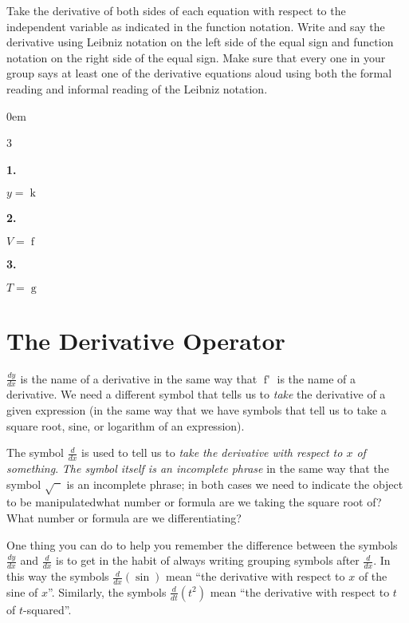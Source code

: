 \documentclass[12pt,]{book}
\theoremstyle{plain}
\theoremstyle{definition}
\numberwithin{equation}{section}
\newenvironment{exercisegroup}%
{\medskip\noindent}%
{\par\bigskip}%
\newlength{\exercisegroupindent}%
\newlength{\exercisegroupitemwidth}%
\newenvironment{exercisegrouplist}%
{\vspace{-\partopsep}%
\begin{adjustwidth}{\exercisegroupindent}{0em}}%
{\end{adjustwidth}%
\vspace{-\partopsep}%
\vspace{\baselineskip}}%
\newenvironment{exercisegroupbycol}[1]%
{\begin{exercisegrouplist}%
\vspace{-\multicolsep}%
\begin{multicols}{#1}%
\setlength{\parindent}{0em}%
\setlength{\exercisegroupitemwidth}{\linewidth}}%
{\end{multicols}%
\vspace{-\multicolsep}%
\end{exercisegrouplist}}%
\newenvironment{exercisegroupitem}[1]%
{\begin{minipage}[t]{\exercisegroupitemwidth}
\vspace{0pt}%
{\bfseries#1}%
\rule{0pt}{\baselineskip}}{\strut%
\end{minipage}%
\hspace{\columnsep}}%
\providecommand\phantomsection{}
\newcommand{\fe}[2]{\mathop{{#1}{\left(#2\right)}}}
\newcommand{\fd}[1]{#1'}
\newcommand{\lz}[2]{\frac{d#1}{d#2}}
\newcommand{\lzo}[1]{\frac{d}{d#1}}
\newcommand{\lzoo}[2]{{\frac{d}{d#1}}{\left(#2\right)}}
\begin{document}
\begin{exercisegroup}%
Take the derivative of both sides of each equation with respect to the independent variable as indicated in the function notation.  Write and say the derivative using Leibniz notation on the left side of the equal sign and function notation on the right side of the equal sign.  Make sure that every one in your group says at least one of the derivative equations aloud using both the formal reading and informal reading of the Leibniz notation.%
\par
\begin{exercisegroupbycol}{3}%
\begin{exercisegroupitem}{1. }\phantomsection\hypertarget{exercise-279}{\null}
\(y=\fe{k}{t}\)%
\end{exercisegroupitem}%
\par%
\begin{exercisegroupitem}{2. }\phantomsection\hypertarget{exercise-280}{\null}
\(V=\fe{f}{r}\)%
\end{exercisegroupitem}%
\par%
\begin{exercisegroupitem}{3. }\phantomsection\hypertarget{exercise-281}{\null}
\(T=\fe{g}{P}\)%
\end{exercisegroupitem}%
\par%
\end{exercisegroupbycol}%
\end{exercisegroup}%
\typeout{************************************************}
\typeout{************************************************}
\section[The Derivative Operator]{The Derivative Operator}\label{section-derivative-operator}
\(\lz{y}{x}\) is the name of a derivative in the same way that \(\fe{\fd{f}}{x}\) is the name of a derivative.  We need a different symbol that tells us to \emph{take} the derivative of a given expression (in the same way that we have symbols that tell us to take a square root, sine, or  logarithm of an expression).%
\par
The symbol \(\lzo{x}\) is used to tell us to \emph{take the derivative with respect to \(x\) of something}. \emph{The symbol itself is an incomplete phrase} in the same way that the symbol \(\sqrt{\phantom{x}}\) is an incomplete phrase; in both cases we need to indicate the object to be manipulated\textemdash{}what number or formula are we taking the square root of? What number or formula  are we differentiating?%
\par
One thing you can do to help you remember the difference between the symbols \(\lz{y}{x}\) and \(\lzo{x}\) is to get in the habit of always writing grouping symbols after \(\lzo{x}\).  In this way the symbols \(\lzoo{x}{\fe{\sin}{x}}\) mean ``the derivative with respect to \(x\) of the sine of \(x\)''.  Similarly, the symbols \(\lzoo{t}{t^2}\) mean ``the derivative with respect to \(t\) of \(t\)-squared''.%
\typeout{************************************************}
\typeout{************************************************}
\end{document}
